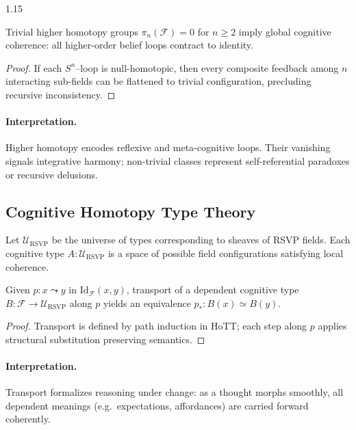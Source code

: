 \documentclass[12pt,a4paper]{article}
\begin{document}
\begin{spacing}{1.15}
\begin{theorem}
\label{thm:coherence}
Trivial higher homotopy groups
\(\pi_n(\mathscr{F})=0\) for \(n\ge2\)
imply global cognitive coherence:
all higher-order belief loops contract to identity.
\end{theorem}

\begin{proof}
If each \(S^n\)–loop is null-homotopic,
then every composite feedback among \(n\) interacting sub-fields
can be flattened to trivial configuration,
precluding recursive inconsistency.
\end{proof}

\paragraph{Interpretation.}
Higher homotopy encodes reflexive and meta-cognitive loops.
Their vanishing signals integrative harmony;
non-trivial classes represent self-referential paradoxes or recursive delusions.

\subsection{Cognitive Homotopy Type Theory}

\begin{definition}
\label{def:coguniv}
Let \(\mathcal{U}_{\mathrm{RSVP}}\)
be the universe of types corresponding to sheaves of RSVP fields.
Each cognitive type \(A:\mathcal{U}_{\mathrm{RSVP}}\)
is a space of possible field configurations
satisfying local coherence.
\end{definition}

\begin{proposition}
\label{prop:transport}
Given \(p:x\leadsto y\) in \(\mathrm{Id}_{\mathscr{F}}(x,y)\),
transport of a dependent cognitive type
\(B:\mathscr{F}\to\mathcal{U}_{\mathrm{RSVP}}\)
along \(p\) yields an equivalence
\(p_*:B(x)\simeq B(y)\).
\end{proposition}

\begin{proof}
Transport is defined by path induction in HoTT;
each step along \(p\) applies structural substitution preserving semantics.
\end{proof}

\paragraph{Interpretation.}
Transport formalizes reasoning under change:
as a thought morphs smoothly, all dependent meanings
(e.g.\ expectations, affordances) are carried forward coherently.


\end{spacing}
\end{document}
